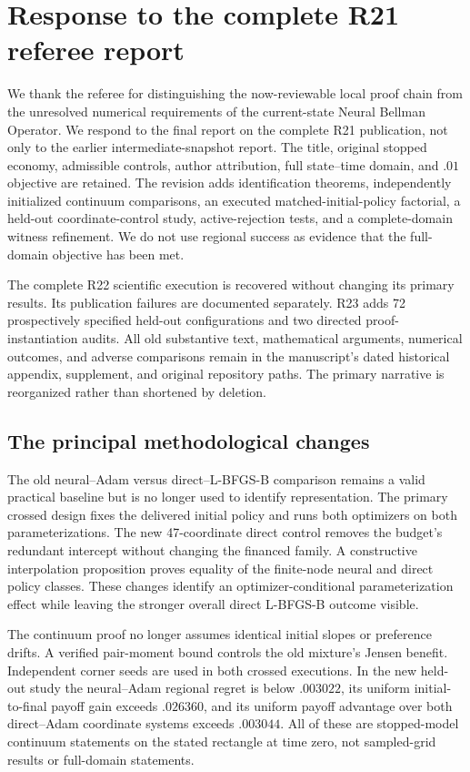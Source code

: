 \section{Response to the complete R21 referee report}
We thank the referee for distinguishing the now-reviewable local proof chain from the unresolved numerical requirements of the current-state Neural Bellman Operator. We respond to the final report on the complete R21 publication, not only to the earlier intermediate-snapshot report. The title, original stopped economy, admissible controls, author attribution, full state--time domain, and $.01$ objective are retained. The revision adds identification theorems, independently initialized continuum comparisons, an executed matched-initial-policy factorial, a held-out coordinate-control study, active-rejection tests, and a complete-domain witness refinement. We do not use regional success as evidence that the full-domain objective has been met.

The complete R22 scientific execution is recovered without changing its primary results. Its publication failures are documented separately. R23 adds 72 prospectively specified held-out configurations and two directed proof-instantiation audits. All old substantive text, mathematical arguments, numerical outcomes, and adverse comparisons remain in the manuscript's dated historical appendix, supplement, and original repository paths. The primary narrative is reorganized rather than shortened by deletion.

\subsection{The principal methodological changes}
The old neural--Adam versus direct--L-BFGS-B comparison remains a valid practical baseline but is no longer used to identify representation. The primary crossed design fixes the delivered initial policy and runs both optimizers on both parameterizations. The new 47-coordinate direct control removes the budget's redundant intercept without changing the financed family. A constructive interpolation proposition proves equality of the finite-node neural and direct policy classes. These changes identify an optimizer-conditional parameterization effect while leaving the stronger overall direct L-BFGS-B outcome visible.

The continuum proof no longer assumes identical initial slopes or preference drifts. A verified pair-moment bound controls the old mixture's Jensen benefit. Independent corner seeds are used in both crossed executions. In the new held-out study the neural--Adam regional regret is below $.003022$, its uniform initial-to-final payoff gain exceeds $.026360$, and its uniform payoff advantage over both direct--Adam coordinate systems exceeds $.003044$. All of these are stopped-model continuum statements on the stated rectangle at time zero, not sampled-grid results or full-domain statements.

